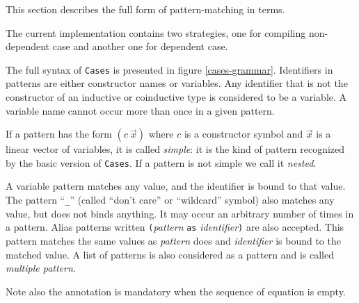 {}

\label{Mult-Cases-full}

This section describes the full form of pattern-matching in {\Coq} terms.

The current implementation contains two strategies, one for compiling
non-dependent case and another one for dependent case.

\label{implementation}
The full syntax of {\tt Cases} is presented in figure \ref{cases-grammar}.
Identifiers in patterns are either constructor names or variables. Any
identifier that is not the constructor of an inductive or coinductive
type is considered to be a variable. A variable name cannot occur more
than once in a given pattern. 

If a pattern has the form $(c~\vec{x})$ where $c$ is a constructor
symbol and $\vec{x}$ is a linear vector of variables, it is called
{\em simple}: it is the kind of pattern recognized by the basic
version of {\tt Cases}. If a pattern is
not simple we call it {\em nested}.

A variable pattern matches any value, and the identifier is bound to
that value. The pattern ``\texttt{\_}'' (called ``don't care'' or
``wildcard'' symbol) also matches any value, but does not binds anything. It
may occur an arbitrary number of times in a pattern. Alias patterns
written \texttt{(}{\sl pattern} \texttt{as} {\sl identifier}\texttt{)} are
also accepted. This pattern matches the same values as {\sl pattern}
does and {\sl identifier} is bound to the matched value.  A list of
patterns is also considered as a pattern and is called {\em multiple
pattern}.

Note also the annotation is mandatory when the sequence of equation is
empty.

